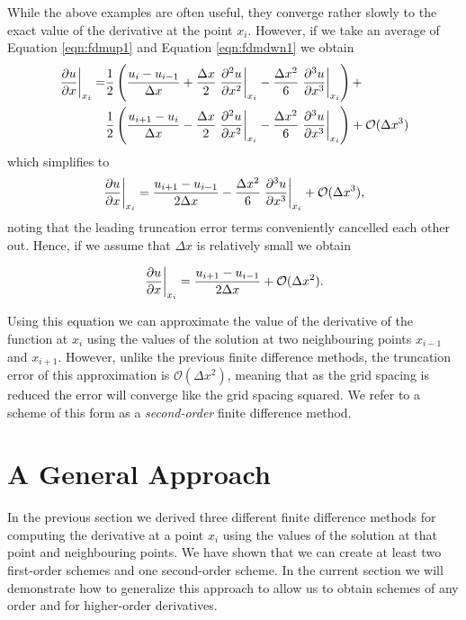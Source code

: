 While the above examples are often useful, they converge rather slowly to the exact value of the derivative at the point $x_i$. However, if we take an average of Equation \ref{eqn:fdmup1} and Equation \ref{eqn:fdmdwn1} we obtain
\begin{equation}
	\begin{aligned}
	\left.\frac{\partial u}{\partial x}\right\rvert_{x_i}^{} = &\frac{1}{2}\left(\frac{u_i - u_{i-1}}{\Delta x} + \frac{\Delta x}{2} \left.\frac{\partial^2 u}{\partial x^2}\right\rvert_{x_i}^{} - \frac{\Delta x^2}{6} \left.\frac{\partial^3 u}{\partial x^3}\right\rvert_{x_i}^{} \right) + \\
	& \frac{1}{2}\left(\frac{u_{i+1} - u_{i}}{\Delta x} - \frac{\Delta x}{2} \left.\frac{\partial^2 u}{\partial x^2}\right\rvert_{x_i}^{} - \frac{\Delta x^2}{6} \left.\frac{\partial^3 u}{\partial x^3}\right\rvert_{x_i}^{} \right) + \mathcal{O}(\Delta x^3)
	\end{aligned}
\end{equation}
which simplifies to
\begin{equation}
	\left.\frac{\partial u}{\partial x}\right\rvert_{x_i}^{} = \frac{u_{i+1} - u_{i-1}}{2 \Delta x} - \frac{\Delta x^2}{6} \left.\frac{\partial^3 u}{\partial x^3}\right\rvert_{x_i}^{} + \mathcal{O}(\Delta x^3),
\end{equation}
noting that the leading truncation error terms conveniently cancelled each other out. Hence, if we assume that $\Delta x$ is relatively small we obtain
\begin{eqBox}
\begin{equation}
	\left.\frac{\partial u}{\partial x}\right\rvert_{x_i}^{} = \frac{u_{i+1} - u_{i-1}}{2 \Delta x} + \mathcal{O}(\Delta x^2).
\end{equation}
\end{eqBox}
Using this equation we can approximate the value of the derivative of the function at $x_i$ using the values of the solution at two neighbouring points $x_{i-1}$ and $x_{i+1}$. However, unlike the previous finite difference methods, the truncation error of this approximation is $\mathcal{O}(\Delta x^2)$, meaning that as the grid spacing is reduced the error will converge like the grid spacing squared. We refer to a scheme of this form as a {\it second-order} finite difference method.

\section{A General Approach}
In the previous section we derived three different finite difference methods for computing the derivative at a point $x_i$ using the values of the solution at that point and neighbouring points. We have shown that we can create at least two first-order schemes and one second-order scheme. In the current section we will demonstrate how to generalize this approach to allow us to obtain schemes of any order and for higher-order derivatives.

